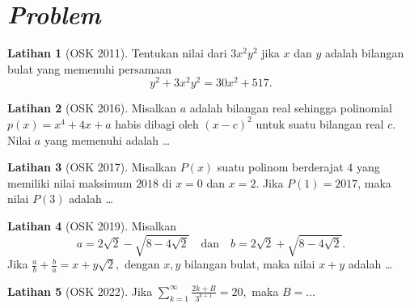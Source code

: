 \documentclass[aspectratio=169]{beamer}
\theoremstyle{definition}
\newtheorem{latihan}{Latihan}
\begin{document}
\section*{\textit{Problem}}
\begin{frame}{\insertsection}
  \begin{latihan}[OSK 2011]
    Tentukan nilai dari $3x^2y^2$ jika $x$ dan $y$ adalah bilangan bulat yang memenuhi persamaan
    \[
      y^2 + 3x^2y^2 = 30x^2 + 517.
    \]
  \end{latihan}
  \begin{latihan}[OSK 2016]
    Misalkan $a$ adalah bilangan real sehingga polinomial $p(x) = x^4 + 4x + a$ habis dibagi oleh $(x-c)^2$ untuk suatu bilangan real $c$. Nilai $a$ yang memenuhi adalah \ldots
  \end{latihan}
  \begin{latihan}[OSK 2017]
    Misalkan $P(x)$ suatu polinom berderajat $4$ yang memiliki nilai maksimum $2018$ di $x=0$ dan $x=2$. Jika $P(1)=2017$, maka nilai $P(3)$ adalah \ldots
  \end{latihan}
\end{frame}

\begin{frame}{\insertsection}
  \begin{latihan}[OSK 2019]
    Misalkan
    \[
      a = 2\sqrt{2} - \sqrt{8 - 4\sqrt{2}}
      \quad \text{dan} \quad
      b = 2\sqrt{2} + \sqrt{8 - 4\sqrt{2}}.
    \]
    Jika
    $
      \frac{a}{b} + \frac{b}{a} = x + y\sqrt{2},
    $
    dengan $x, y$ bilangan bulat, maka nilai $x + y$ adalah \ldots
  \end{latihan}

  \begin{latihan}[OSK 2022]
    Jika
    $
      \displaystyle\sum_{k=1}^{\infty} \frac{2k + B}{3^{k+1}} = 20,
    $
    maka $B = \ldots$
  \end{latihan}


\end{frame}
\end{document}
